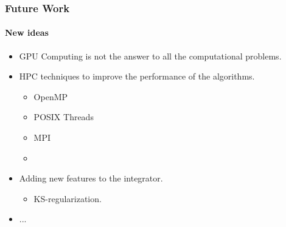 \begin{frame}
    \frametitle{Future Work}
    \framesubtitle{New ideas}
    \begin{itemize}
        \item GPU Computing is not the answer to all the computational
            problems.
        \item HPC techniques to improve the performance of the algorithms.
        \begin{itemize}
            \item OpenMP
            \item POSIX Threads
            \item MPI
            \item
        \end{itemize}
        \item Adding new features to the integrator.
        \begin{itemize}
            \item KS-regularization.
        \end{itemize}
        \item ...
    \end{itemize}
\end{frame}
